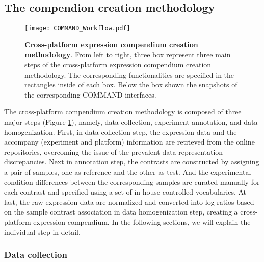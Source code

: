 \subsection{The compendion creation methodology}
\label{sec:colombos-comp-method}

\begin{figure}
  \centering
  \texttt{[image: COMMAND\_Workflow.pdf]}
  \caption[Cross-platform expression compendium creation methodology]{
    \textbf{Cross-platform expression compendium creation methodology}.
    From left to right, three box represent three main steps of the 
    cross-platform expression compendium creation methodology. The 
    corresponding functionalities are specified in the rectangles inside of 
    each box. Below the box shown the snapshots of the corresponding COMMAND 
    interfaces.}
  \label{fig:command-workflow}
\end{figure}


The cross-platform compendium creation methodology is composed of three major
steps (Figure \ref{fig:command-workflow}), namely, data collection, experiment
annotation, and data homogenization.
%
First, in data collection step, the expression data and the accompany
(experiment and platform) information are retrieved from the online
repositories, overcoming the issue of the prevalent data representation
discrepancies.
%
Next in annotation step, the contrasts are constructed by assigning a pair of
samples, one as reference and the other as test. And the experimental condition
differences between the corresponding samples are curated manually for each
contrast and specified using a set of in-house controlled vocabularies.
%
At last, the raw expression data are normalized and converted into log ratios
based on the sample contrast association in data homogenization step, creating
a cross-platform expression compendium.
%
In the following sections, we will explain the individual step in detail.



\subsubsection{Data collection}


